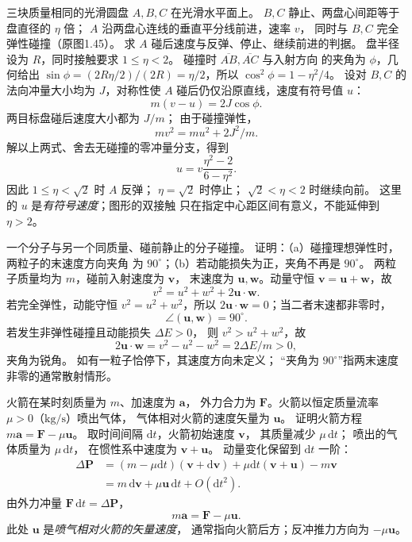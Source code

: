 三块质量相同的光滑圆盘 $A,B,C$ 在光滑水平面上。
$B,C$ 静止、两盘心间距等于盘直径的 $\eta$ 倍；
$A$ 沿两盘心连线的垂直平分线前进，速率 $v$，
同时与 $B,C$ 完全弹性碰撞（原图1.45）。
求 $A$ 碰后速度与反弹、停止、继续前进的判据。
\exsolution
盘半径设为 $R$，同时接触要求 $1\le\eta<2$。
碰撞时 $\overline{AB},\overline{AC}$ 与入射方向
的夹角为 $\phi$，几何给出
$\sin\phi=(2R\eta/2)/(2R)=\eta/2$，所以
$\cos^2\phi=1-\eta^2/4$。
设对 $B,C$ 的法向冲量大小均为 $J$，对称性使
$A$ 碰后仍仅沿原直线，速度有符号值 $u$：
\[
m(v-u)=2J\cos\phi.
\]
两目标盘碰后速度大小都为 $J/m$；
由于碰撞弹性，
\[
mv^2=mu^2+2J^2/m.
\]
解以上两式、舍去无碰撞的零冲量分支，得到
\[
\boxed{u=v\frac{\eta^2-2}{6-\eta^2}}.
\]
因此 $1\le\eta<\sqrt2$ 时 $A$ 反弹；
$\eta=\sqrt2$ 时停止；
$\sqrt2<\eta<2$ 时继续向前。
\excheck 这里的 $u$ 是\emph{有符号速度}；图形的双接触
只在指定中心距区间有意义，不能延伸到 $\eta>2$。

一个分子与另一个同质量、碰前静止的分子碰撞。
证明：（a）碰撞理想弹性时，两粒子的末速度方向夹角
为 $90^\circ$；（b）若动能损失为正，夹角不再是 $90^\circ$。
\exsolution
两粒子质量均为 $m$，碰前入射速度为 $\bm v$，
末速度为 $\bm u,\bm w$。动量守恒
$\bm v=\bm u+\bm w$，故
\[
v^2=u^2+w^2+2\bm u\cdot\bm w.
\]
若完全弹性，动能守恒
$v^2=u^2+w^2$，所以
$2\bm u\cdot\bm w=0$；当二者末速都非零时，
\[
\boxed{\angle(\bm u,\bm w)=90^\circ}.
\]
若发生非弹性碰撞且动能损失 $\Delta E>0$，
则 $v^2>u^2+w^2$，故
\[
2\bm u\cdot\bm w
=v^2-u^2-w^2=2\Delta E/m>0,
\]
夹角为锐角。
\excheck 如有一粒子恰停下，其速度方向未定义；
“夹角为 $90^\circ$”指两末速度非零的通常散射情形。

火箭在某时刻质量为 $m$、加速度为 $\bm a$，
外力合力为 $\bm F$。火箭以恒定质量流率
$\mu>0$（$\mathrm{kg/s}$）喷出气体，
气体相对火箭的速度矢量为 $\bm u$。
证明火箭方程 $m\bm a=\bm F-\mu\bm u$。
\exsolution
取时间间隔 $\mathrm dt$，火箭初始速度 $\bm v$，
其质量减少 $\mu\,\mathrm dt$；
喷出的气体质量为 $\mu\,\mathrm dt$，
在惯性系中速度为 $\bm v+\bm u$。
动量变化保留到 $\mathrm dt$ 一阶：
\[
\begin{aligned}
\Delta\bm P
&=(m-\mu\mathrm dt)(\bm v+\mathrm d\bm v)
 +\mu\mathrm dt(\bm v+\bm u)-m\bm v\\
&=m\,\mathrm d\bm v+\mu\bm u\,\mathrm dt
+O(\mathrm dt^2).
\end{aligned}
\]
由外力冲量 $\bm F\,\mathrm dt=\Delta\bm P$，
\[
\boxed{m\bm a=\bm F-\mu\bm u}.
\]
\excheck 此处 $\bm u$ 是\emph{喷气相对火箭的矢量速度}，
通常指向火箭后方；反冲推力方向为 $-\mu\bm u$。

